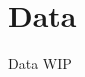 \documentclass[../../UsabilityReport.tex]{subfiles}
\begin{document}
\section{Data}
	Data WIP
\end{document}
